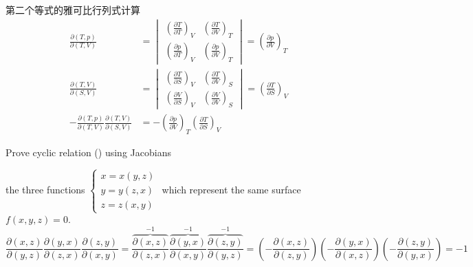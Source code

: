 \begin{example}
\begin{explain}
    第二个等式的雅可比行列式计算
\begin{align*}
        \frac{\partial(T,p)}{\partial(T,V)} &= 
        \begin{vmatrix}
        \left( \frac{\partial T}{\partial T} \right)_V & \left( \frac{\partial T}{\partial V} \right)_T \\
        \left( \frac{\partial p}{\partial T} \right)_V & \left( \frac{\partial p}{\partial V} \right)_T
        \end{vmatrix}
        = \left( \frac{\partial p}{\partial V} \right)_T
        \\
        \frac{\partial(T,V)}{\partial(S,V)} &= 
        \begin{vmatrix}
        \left( \frac{\partial T}{\partial S} \right)_V & \left( \frac{\partial T}{\partial V} \right)_S \\
        \left( \frac{\partial V}{\partial S} \right)_V & \left( \frac{\partial V}{\partial V} \right)_S
        \end{vmatrix}
        = \left( \frac{\partial T}{\partial S} \right)_V
        \\ 
        -\frac{\partial(T,p)}{\partial(T,V)} \frac{\partial(T,V)}{\partial(S,V)} 
&= -\left( \frac{\partial p}{\partial V} \right)_T \left( \frac{\partial T}{\partial S} \right)_V
\end{align*}
    \end{explain}
\end{example}
\begin{example}\label{proofTRI}
    Prove cyclic relation (\pageref{TRI}) using Jacobians

    the three functions
\(\begin{cases}
x = x(y, z) \\
y = y(z, x) \\
z = z(x, y)
\end{cases}\)
which represent the same surface \( f(x, y, z) = 0 \). 
\[    \frac{\partial(x,z)}{\partial(y,z)}\frac{\partial(y,x)}{\partial(z,x)}\frac{\partial(z,y)}{\partial(x,y)} 
    = \frac{\overbrace{\partial(x,z)}^{-1}}{\partial(z,x)}
    \frac{\overbrace{\partial(y,x)}^{-1}}{\partial(x,y)}
    \frac{\overbrace{\partial(z,y)}^{-1}}{\partial(y,z)}
    =\left(-\frac{\partial(x,z)}{\partial(z,y)}\right) 
    \left(-\frac{\partial(y,x)}{\partial(x,z)}\right) 
    \left(-\frac{\partial(z,y)}{\partial(y,x)}\right)
    = -1\]
\end{example}
